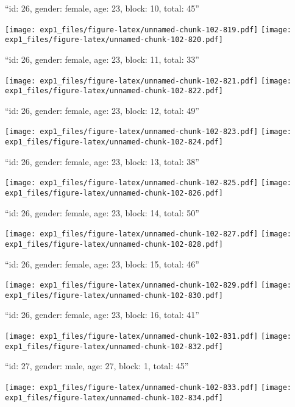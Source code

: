 \documentclass[11pt,,]{article}
\begin{document}
\newpage
[1] 

``id: 26, gender: female, age: 23, block: 10, total: 45''

\texttt{[image: exp1\_files/figure-latex/unnamed-chunk-102-819.pdf]}
\texttt{[image: exp1\_files/figure-latex/unnamed-chunk-102-820.pdf]}

\newpage
[1] 

``id: 26, gender: female, age: 23, block: 11, total: 33''

\texttt{[image: exp1\_files/figure-latex/unnamed-chunk-102-821.pdf]}
\texttt{[image: exp1\_files/figure-latex/unnamed-chunk-102-822.pdf]}

\newpage
[1] 

``id: 26, gender: female, age: 23, block: 12, total: 49''

\texttt{[image: exp1\_files/figure-latex/unnamed-chunk-102-823.pdf]}
\texttt{[image: exp1\_files/figure-latex/unnamed-chunk-102-824.pdf]}

\newpage
[1] 

``id: 26, gender: female, age: 23, block: 13, total: 38''

\texttt{[image: exp1\_files/figure-latex/unnamed-chunk-102-825.pdf]}
\texttt{[image: exp1\_files/figure-latex/unnamed-chunk-102-826.pdf]}

\newpage
[1] 

``id: 26, gender: female, age: 23, block: 14, total: 50''

\texttt{[image: exp1\_files/figure-latex/unnamed-chunk-102-827.pdf]}
\texttt{[image: exp1\_files/figure-latex/unnamed-chunk-102-828.pdf]}

\newpage
[1] 

``id: 26, gender: female, age: 23, block: 15, total: 46''

\texttt{[image: exp1\_files/figure-latex/unnamed-chunk-102-829.pdf]}
\texttt{[image: exp1\_files/figure-latex/unnamed-chunk-102-830.pdf]}

\newpage
[1] 

``id: 26, gender: female, age: 23, block: 16, total: 41''

\texttt{[image: exp1\_files/figure-latex/unnamed-chunk-102-831.pdf]}
\texttt{[image: exp1\_files/figure-latex/unnamed-chunk-102-832.pdf]}

\newpage
[1] 

``id: 27, gender: male, age: 27, block: 1, total: 45''

\texttt{[image: exp1\_files/figure-latex/unnamed-chunk-102-833.pdf]}
\texttt{[image: exp1\_files/figure-latex/unnamed-chunk-102-834.pdf]}
\end{document}
